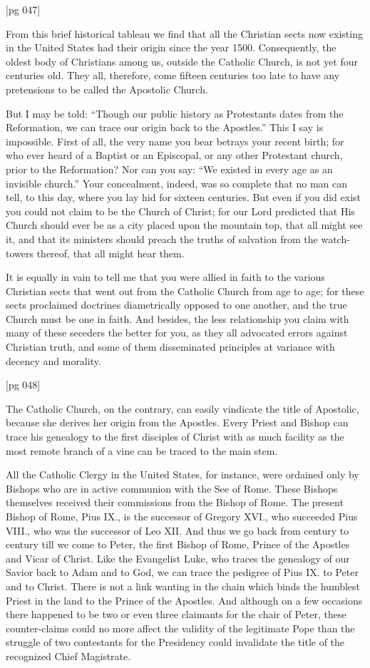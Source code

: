 [pg 047]

From this brief historical tableau we find that
all the Christian sects now existing in the United
States had their origin since the year 1500. Consequently,
the oldest body of Christians among us,
outside the Catholic Church, is not yet four centuries
old. They all, therefore, come fifteen centuries
too late to have any pretensions to be called
the Apostolic Church.

But I may be told: “Though our public history
as Protestants dates from the Reformation, we
can trace our origin back to the Apostles.” This
I say is impossible. First of all, the very name
you bear betrays your recent birth; for who ever
heard of a Baptist or an Episcopal, or any other
Protestant church, prior to the Reformation?
Nor can you say: “We existed in every age as
an invisible church.” Your concealment, indeed,
was so complete that no man can tell, to this
day, where you lay hid for sixteen centuries. But
even if you did exist you could not claim to be
the Church of Christ; for our Lord predicted that
His Church should ever be as a city placed upon
the mountain top, that all might see it, and that
its ministers should preach the truths of salvation
from the watch-towers thereof, that all might
hear them.

It is equally in vain to tell me that you were
allied in faith to the various Christian sects that
went out from the Catholic Church from age to
age; for these sects proclaimed doctrines diametrically
opposed to one another, and the true
Church must be one in faith. And besides, the
less relationship you claim with many of these
seceders the better for you, as they all advocated
errors against Christian truth, and some of them
disseminated principles at variance with decency
and morality.

[pg 048]

The Catholic Church, on the contrary, can easily
vindicate the title of Apostolic, because she derives
her origin from the Apostles. Every Priest
and Bishop can trace his genealogy to the first disciples
of Christ with as much facility as the most
remote branch of a vine can be traced to the main
stem.

All the Catholic Clergy in the United States,
for instance, were ordained only by Bishops who
are in active communion with the See of Rome.
These Bishops themselves received their commissions
from the Bishop of Rome. The present
Bishop of Rome, Pius IX., is the successor of
Gregory XVI., who succeeded Pius VIII., who
was the successor of Leo XII. And thus we go
back from century to century till we come to Peter,
the first Bishop of Rome, Prince of the Apostles
and Vicar of Christ. Like the Evangelist Luke,
who traces the genealogy of our Savior back to
Adam and to God, we can trace the pedigree of
Pius IX. to Peter and to Christ. There is not a
link wanting in the chain which binds the humblest
Priest in the land to the Prince of the Apostles.
And although on a few occasions there happened
to be two or even three claimants for the chair
of Peter, these counter-claims could no more affect
the validity of the legitimate Pope than the
struggle of two contestants for the Presidency
could invalidate the title of the recognized Chief
Magistrate.


